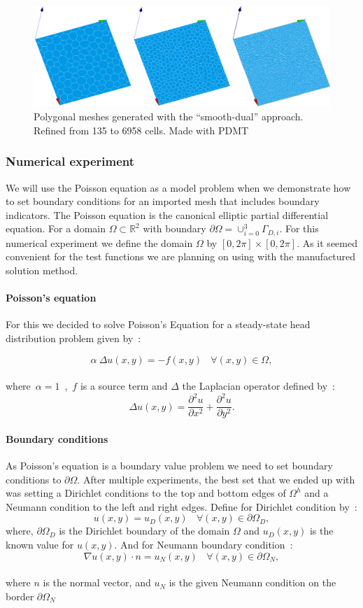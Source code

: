 \documentclass{article}
\begin{document}
\begin{figure}[htbp]
	\centering
	\includegraphics[width=1.0\textwidth]{./Images/polyMesh}
	\caption{\label{fig:polyMesh} Polygonal meshes generated with the ``smooth-dual'' approach. Refined from 135 to 6958 cells. Made with PDMT~\cite{Badri_pdmt}}
\end{figure}

\subsubsection{Numerical experiment}

We will use the Poisson equation as a model problem when we demonstrate how to set boundary conditions for an imported mesh that includes boundary indicators. The Poisson equation is the canonical elliptic partial differential equation. For a domain $\Omega \subset \mathbb{R}^2$ with boundary $\partial \Omega = \cup_{i = 0}^3 \Gamma_{D, i}$. For this numerical experiment we define the domain $\Omega$ by $[0, 2\pi] \times [0, 2\pi]$. As it seemed convenient for the test functions we are planning on using with the manufactured solution method.

\paragraph{Poisson's equation}
For this we decided to solve Poisson's Equation for a steady-state head distribution problem given by~:

\[
\boxed{\alpha~\Delta u(x,y) = - f(x,y) ~~~~\forall (x,y) \in \Omega},
\]\\
where~$\alpha = 1$~,~$f$ is a source term and $\Delta$ the Laplacian operator defined by~:
\[
\Delta{u(x,y)} = \frac{{\partial^2 u}}{\partial x^2} + \frac{{\partial^2 u}}{\partial y^2}.
\]

\paragraph{Boundary conditions}
As Poisson's equation is a boundary value problem we need to set boundary conditions to $\partial\Omega$. After multiple experiments, the best set that we ended up with was setting a Dirichlet conditions to the top and bottom edges of $\Omega^h$ and a Neumann condition to the left and right edges. Define for Dirichlet condition by~:
\[
u(x,y) = u_D(x,y)~~~~\forall (x,y) \in \partial\Omega_D,
\]
where, $\partial\Omega_D$ is the Dirichlet boundary of the domain $\Omega$ and $u_D(x,y)$ is the known value for $u(x,y)$. And for Neumann boundary condition~:
\[
\nabla u(x,y) \cdot n = u_N(x,y)~~~~\forall (x,y) \in \partial\Omega_N,
\]\\
where $n$ is the normal vector, and $u_N$ is the given Neumann condition on the border $\partial\Omega_N$
\end{document}
